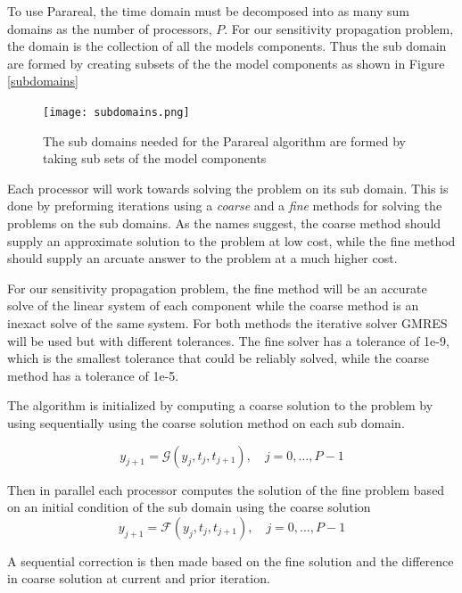 \documentclass[conf]{new-aiaa}
\begin{document}
To use Parareal, the time domain must be decomposed into as many sum domains as the number of processors, $P$.
For our sensitivity propagation problem, the domain is the collection of all the models components.
Thus the sub domain are formed by creating subsets of the the model components as shown in Figure \ref{subdomains}


\begin{figure}[H]
	\centering
	\texttt{[image: subdomains.png]}
	\caption{The sub domains needed for the Parareal algorithm are formed by taking sub sets of the model components}
	\label{fig:subdomains}
\end{figure}


Each processor will work towards solving the problem on its sub domain.
This is done by preforming iterations using a \emph{coarse} and a \emph{fine} methods for solving the problems on the sub domains.
As the names suggest, the coarse method should supply an approximate solution to the problem at low cost, while the fine method should supply an arcuate answer to the problem at a much higher cost.

For our sensitivity propagation problem, the fine method will be an accurate solve of the linear system of each component while the coarse method is an inexact solve of the same system.
For both methods the iterative solver GMRES will be used but with different tolerances.
The fine solver has a tolerance of 1e-9, which is the smallest tolerance that could be reliably solved, while the coarse method has a tolerance of 1e-5.




The algorithm is initialized by computing a coarse solution to the problem by using sequentially using the coarse solution method on each sub domain.

\begin{equation}
    y_{j+1}=\mathcal{G}\left(y_{j}, t_{j}, t_{j+1}\right), \quad j=0, \ldots, P-1
\end{equation}


Then in parallel each processor computes the solution of the fine problem based on an initial condition of the sub domain using the coarse solution
\begin{equation}
    y_{j+1}=\mathcal{F}\left(y_{j}, t_{j}, t_{j+1}\right), \quad j=0, \ldots, P-1
\end{equation}


A sequential correction is then made based on the fine solution and the difference in coarse solution at current and prior iteration.
\end{document}
